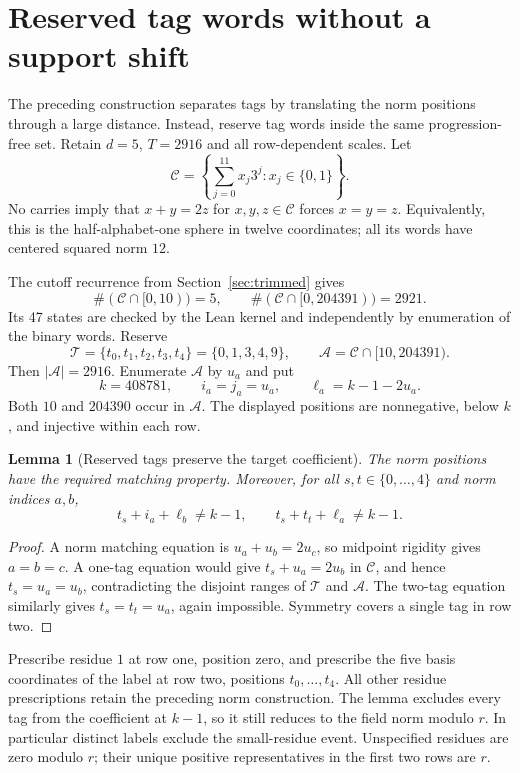 \documentclass[11pt]{article}
\newtheorem{lemma}{Lemma}
\begin{document}
\section{Reserved tag words without a support shift}\label{sec:reserved}
The preceding construction separates tags by translating the norm positions
through a large distance. Instead, reserve tag words inside the same
progression-free set. Retain $d=5$, $T=2916$ and all row-dependent scales.
Let
\[
 \mathcal C=\left\{\sum_{j=0}^{11}x_j3^j:x_j\in\{0,1\}\right\}.
\]
No carries imply that $x+y=2z$ for $x,y,z\in\mathcal C$ forces $x=y=z$.
Equivalently, this is the half-alphabet-one sphere in twelve coordinates;
all its words have centered squared norm $12$.

The cutoff recurrence from Section~\ref{sec:trimmed} gives
\[
 \#(\mathcal C\cap[0,10))=5,\qquad
 \#(\mathcal C\cap[0,204391))=2921.
\]
Its 47 states are checked by the Lean kernel and independently by
enumeration of the binary words. Reserve
\[
 \mathcal T=\{t_0,t_1,t_2,t_3,t_4\}=\{0,1,3,4,9\},
 \qquad \mathcal A=\mathcal C\cap[10,204391).
\]
Then $|\mathcal A|=2916$. Enumerate $\mathcal A$ by $u_a$ and put
\[
 k=408781,\qquad i_a=j_a=u_a,\qquad \ell_a=k-1-2u_a.
\]
Both $10$ and $204390$ occur in $\mathcal A$. The displayed positions
are nonnegative, below $k$, and injective within each row.

\begin{lemma}[Reserved tags preserve the target coefficient]
The norm positions have the required matching property. Moreover, for all
$s,t\in\{0,\ldots,4\}$ and norm indices $a,b$,
\[
 t_s+i_a+\ell_b\ne k-1,\qquad
 t_s+t_t+\ell_a\ne k-1.
\]
\end{lemma}
\begin{proof}
A norm matching equation is $u_a+u_b=2u_c$, so midpoint rigidity gives
$a=b=c$. A one-tag equation would give $t_s+u_a=2u_b$ in $\mathcal C$,
and hence $t_s=u_a=u_b$, contradicting the disjoint ranges of
$\mathcal T$ and $\mathcal A$. The two-tag equation similarly gives
$t_s=t_t=u_a$, again impossible. Symmetry covers a single tag in row two.
\end{proof}

Prescribe residue $1$ at row one, position zero, and prescribe the five
basis coordinates of the label at row two, positions $t_0,\ldots,t_4$.
All other residue prescriptions retain the preceding norm construction.
The lemma excludes every tag from the coefficient at $k-1$, so it still
reduces to the field norm modulo $r$. In particular distinct labels exclude
the small-residue event. Unspecified residues are zero modulo $r$;
their unique positive representatives in the first two rows are $r$.
\end{document}
